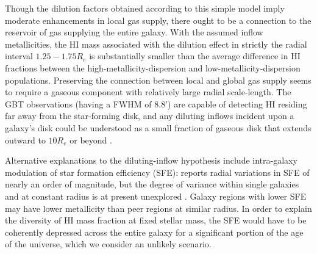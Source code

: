 Though the dilution factors obtained according to this simple model imply moderate enhancements in local gas supply, there ought to be a connection to the reservoir of gas supplying the entire galaxy. With the assumed inflow metallicities, the HI mass associated with the dilution effect in strictly the radial interval $1.25-1.75 R_e$ is substantially smaller than the average difference in HI fractions between the high-metallicity-dispersion and low-metallicity-dispersion populations. Preserving the connection between local and global gas supply seems to require a gaseous component with relatively large radial scale-length. The GBT observations (having a FWHM of 8.8') are capable of detecting HI residing far away from the star-forming disk, and any diluting inflows incident upon a galaxy's disk could be understood as a small fraction of gaseous disk that extends outward to $10 R_e$ or beyond \citep{bigiel_blitz_12-gasprofile}.

Alternative explanations to the diluting-inflow hypothesis include intra-galaxy modulation of star formation efficiency (SFE): \citet{schaefer_19_ohno} reports radial variations in SFE of nearly an order of magnitude, but the degree of variance within single galaxies and at constant radius is at present unexplored \citep[see also][]{bigiel_leroy_08}. Galaxy regions with lower SFE may have lower metallicity than peer regions at similar radius. In order to explain the diversity of HI mass fraction at fixed stellar mass, the SFE would have to be coherently depressed across the entire galaxy for a significant portion of the age of the universe, which we consider an unlikely scenario.

